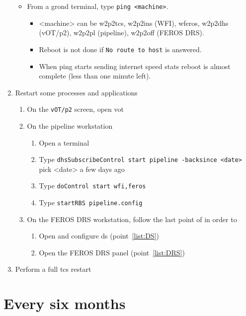 \documentclass[11pt,fleqn,a4paper]{book}
\begin{document}
\begin{enumerate}
\begin{itemize}
        \item From a grond terminal, type \texttt{ping <machine>}.
             \begin{itemize}
             \item <machine> can be \gls{w2p2tcs}, \gls{w2p2ins} (WFI), \gls{wferos}, \gls{w2p2dhs} (vOT/p2), \gls{w2p2pl} (pipeline), \gls{w2p2off} (FEROS DRS). 
             \item Reboot is not done if \texttt{No route to host} is answered.
             \item When ping starts sending internet speed stats reboot is almost complete (less than one minute left).
             \end{itemize}
    \end{itemize}
\item Restart some processes and applications
    \begin{enumerate}
        \item On the \texttt{vOT/p2} screen, open \gls{vot}
        \item On the pipeline workstation
             \begin{enumerate}
                \item Open  a terminal
                \item Type \texttt{dhsSubscribeControl start pipeline -backsince <date>}\\
            pick <date> a few days ago
                \item Type \texttt{doControl start wfi,feros}
                \item Type \texttt{startRBS pipeline.config}
             \end{enumerate}
        \item On the FEROS DRS workstation, follow the last point of  in order to
             \begin{enumerate}
                \item Open and configure \gls{ds} (point~\ref{list:DS})
                \item Open the FEROS DRS panel (point~\ref{list:DRS})
             \end{enumerate}
    \end{enumerate}
\item \label{list:soft:tcs}Perform a full \gls{tcs} restart
\end{enumerate}

\section{Every six months}
\end{document}
